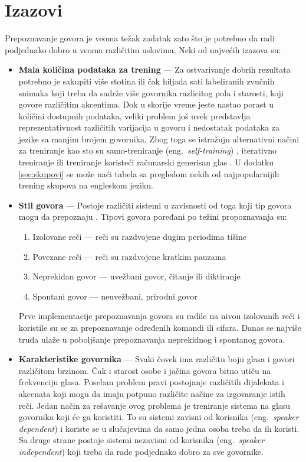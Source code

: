 \documentclass[a4paper]{article}
\begin{document}
\section{Izazovi}
Prepoznavanje govora je veoma težak zadatak zato što je potrebno da radi podjednako dobro u veoma različitim uslovima.
Neki od najvećih izazova su:
\begin{itemize}
  \item \textbf{Mala količina podataka za trening} --- 
  Za ostvarivanje dobrih rezultata potrebno je sakupiti više stotina ili čak hiljada sati labeliranih zvučnih snimaka koji treba da sadrže više govornika razlicitog pola i starosti, koji govore različitim akcentima. 
  Dok u skorije vreme jeste nastao porast u količini dostupnih podataka, veliki problem još uvek predstavlja reprezentativnost različitih varijacija u govoru i nedostatak podataka za jezike sa manjim brojem govornika. 
  Zbog toga se istražuju alternativni načini za treniranje kao sto su samo-treniranje (eng.~{\em self-training}) \cite{baevski2020wav2vec}, iterativno treniranje \cite{park2020noisy} ili treniranje koristeći računarski generisan glas \cite{hannun2014deep}. 
  U dodatku \ref{sec:skupovi} se može naći tabela sa pregledom nekih od najpopularnijih trening skupova na engleskom jeziku.
  
  \item \textbf{Stil govora} --- 
  Postoje različiti sistemi u zavisnosti od toga koji tip govora mogu da prepoznaju \cite{anusuya2010speech}. Tipovi govora poređani po težini propoznavanja su: 
  \begin{enumerate}
    \item Izolovane reči --- reči su razdvojene dugim periodima tišine
    \item Povezane reči --- reči su razdvojene kratkim pauzama
    \item Neprekidan govor --- uvežbani govor, čitanje ili diktiranje
    \item Spontani govor --- neuvežbani, prirodni govor 
  \end{enumerate}
  Prve implementacije prepoznavanja govora su radile na nivou izolovanih reči i koristile su se za prepoznavanje određenih komandi ili cifara.
  Danas se najviše truda ulaže u poboljšanje prepoznavanja neprekidnog i spontanog govora.

  \item \textbf{Karakteristike govornika} ---
  Svaki čovek ima različitu boju glasa i govori različitom brzinom. Čak i starost osobe i jačina govora bitno utiču na frekvenciju glasa.
  Poseban problem pravi postojanje različitih dijalekata i akcenata koji mogu da imaju potpuno različite načine za izgovaranje istih reči.
  Jedan način za rešavanje ovog problema je treniranje sistema na glasu govornika koji će ga koristiti.
  To su sistemi zavisni od korisnika (eng.~{\em speaker dependent}) i koriste se u slučajevima da samo jedna osoba treba da ih koristi.
  Sa druge strane postoje sistemi nezavisni od korisnika (eng.~{\em speaker independent}) koji treba da rade podjednako dobro za sve govornike.
  

\end{itemize}
\end{document}
